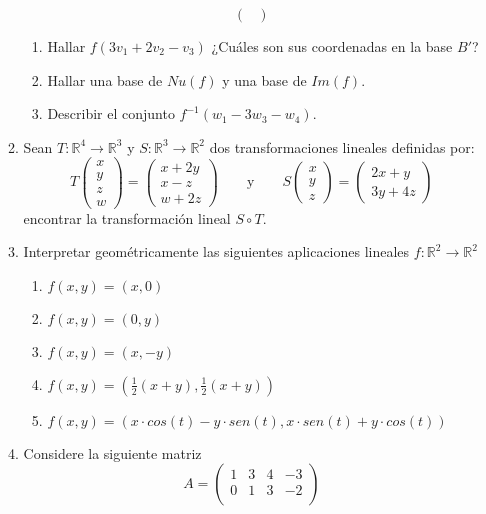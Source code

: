 \documentclass[12pt,letterpaper]{article}
\begin{document}
\begin{enumerate}
\begin{enumerate}
$$\begin{pmatrix}
  \end{pmatrix}
  $$
  \begin{enumerate}
    \item Hallar $f(3v_1 + 2v_2 - v_3)$ ¿Cuáles son sus coordenadas en la base $B'$?
    \item Hallar una base de $Nu(f)$ y una base de $Im(f)$.
    \item Describir el conjunto $f^{-1}(w_1 - 3w_3 - w_4)$.
  \end{enumerate}
  \item Sean $T: \mathbb{R}^4\to\mathbb{R}^3$ y $S: \mathbb{R}^3\to\mathbb{R}^2$ dos transformaciones lineales definidas por:
  $$
  T\begin{pmatrix}
    x\\
    y\\
    z\\
    w
  \end{pmatrix}=\begin{pmatrix}
    x+2y\\
    x-z\\
    w+2z
    \end{pmatrix}\qquad\text{y}\qquad S\begin{pmatrix}
    x\\
    y\\
    z
  \end{pmatrix}=\begin{pmatrix}
    2x+y\\
    3y+4z
  \end{pmatrix}
  $$
  encontrar la transformación lineal $S \circ T$.
  \item Interpretar geométricamente las siguientes aplicaciones lineales $f : \mathbb{R}^2 \to \mathbb{R}^2$
    \begin{enumerate}
      \item $f (x, y) = (x, 0)$
      \item $f (x, y) = (0, y)$
      \item $f (x, y) = (x, -y)$
      \item $f (x, y) = ( \frac{1}{2}(x + y), \frac{1}{2}(x + y))$
      \item $f (x, y) = (x\cdot cos(t) - y\cdot sen(t) , x\cdot sen(t) + y\cdot cos(t))$
    \end{enumerate}
  \item Considere la siguiente matriz
    $$
    A=\begin{pmatrix}
      1 & 3 & 4 & -3\\
      0 & 1 & 3 & -2\\

\end{pmatrix}$$
\end{enumerate}
\end{enumerate}
\end{document}
